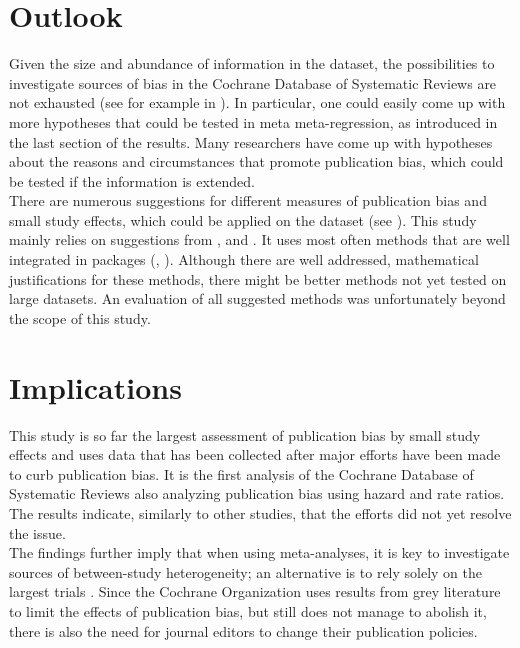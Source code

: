 \documentclass[11pt,a4paper,twoside]{book}\usepackage[]{graphicx}\usepackage[]{color}
\begin{document}
\section{Outlook}
Given the size and abundance of information in the dataset, the possibilities to investigate sources of bias in the Cochrane Database of Systematic Reviews are not exhausted (see for example in \citet{ioannidis.2017}). In particular, one could easily come up with more hypotheses that could be tested in meta meta-regression, as introduced in the last section of the results. Many researchers have come up with hypotheses about the reasons and circumstances that promote publication bias, which could be tested if the information is extended.\\
There are numerous suggestions for different measures of publication bias and small study effects, which could be applied on the dataset (see \citet{mueller.2016}). This study mainly relies on suggestions from \citet{Sterne}, \citet{Ioannidis2007} and \citet{limitmeta}. It uses most often methods that are well integrated in packages (\citet{metafor.package}, \citet{meta.package}). Although there are well addressed, mathematical justifications for these methods, there might be better methods not yet tested on large datasets. An evaluation of all suggested methods was unfortunately beyond the scope of this study.


\section{Implications}
This study is so far the largest assessment of publication bias by small study effects and uses data that has been collected after major efforts have been made to curb publication bias. It is the first analysis of the Cochrane Database of Systematic Reviews also analyzing publication bias using hazard and rate ratios. The results indicate, similarly to other studies, that the efforts did not yet resolve the issue. \\
The findings further imply that when using meta-analyses, it is key to investigate sources of between-study heterogeneity; an alternative is to rely solely on the largest trials \citep{largest.study.only}. Since the Cochrane Organization uses results from grey literature to limit the effects of publication bias, but still does not manage to abolish it, there is also the need for journal editors to change their publication policies.




\appendix



\cleardoublepage
{}
{}


 


\cleardoublepage
\end{document}
